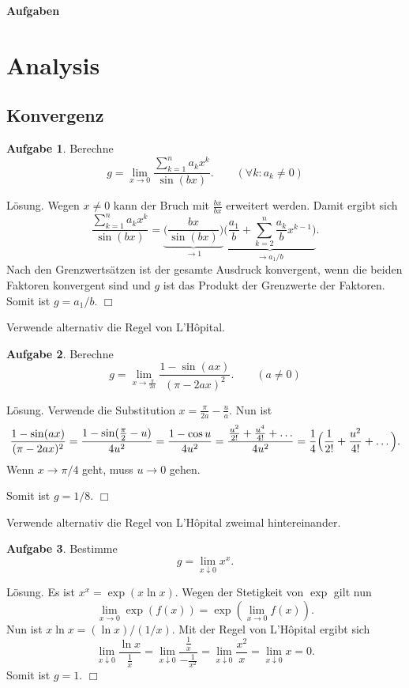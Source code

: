 \documentclass[a4paper,12pt,fleqn,twoside]{article}
\numberwithin{equation}{section}
\theoremstyle{definition}
\newtheorem{Aufgabe}{\sffamily Aufgabe}[section]
\begin{document}
\thispagestyle{empty}

\noindent
{\huge\sf\bfseries Aufgaben}

\tableofcontents

\section{Analysis}
\subsection{Konvergenz}
\begin{Aufgabe}
Berechne
\[g = \lim_{x\to 0}\frac{\sum_{k=1}^n a_k x^k}{\sin(bx)}.
\qquad(\forall k\colon a_k\ne 0)\]
\end{Aufgabe}
\noindent
Lösung.
Wegen $x\ne 0$ kann der Bruch mit $\frac{bx}{bx}$ erweitert
werden. Damit ergibt sich
\[\frac{\sum_{k=1}^n a_k x^k}{\sin(bx)}
= \underbrace{\bigg(\frac{bx}{\sin(bx)}\bigg)}_{\to 1}
\underbrace{\bigg(\frac{a_1}{b}+\sum_{k=2}^n\frac{a_k}{b}x^{k-1}\bigg)}_{\to a_1/b}.
\]
Nach den Grenzwertsätzen ist der gesamte Ausdruck konvergent, wenn
die beiden Faktoren konvergent sind und $g$ ist das Produkt
der Grenzwerte der Faktoren. Somit ist $g=a_1/b$. $\Box$

Verwende alternativ die Regel von L'Hôpital.

\begin{Aufgabe}
Berechne
\[g = \lim_{x\to\frac{\pi}{2a}} \frac{1-\sin(ax)}{(\pi-2ax)^2}.
\qquad(a\ne 0)\]
\end{Aufgabe}
\noindent
Lösung.
Verwende die Substitution $x=\frac{\pi}{2a}-\frac{u}{a}$.
Nun ist
\[
\frac{1-\sin(ax)}{(\pi-2ax)^2}
= \frac{1-\sin(\frac{\pi}{2}-u)}{4u^2}
= \frac{1-\cos u}{4u^2}\\
= \frac{\frac{u^2}{2!}+\frac{u^4}{4!}+\ldots}{4u^2}
= \frac{1}{4} \Big(\frac{1}{2!}+\frac{u^2}{4!}+\ldots\Big).
\]
Wenn $x\to\pi/4$ geht, muss $u\to 0$ gehen.

Somit ist $g=1/8$. $\Box$

Verwende alternativ die Regel von L'Hôpital zweimal hintereinander.

\begin{Aufgabe}
Bestimme
\[g=\lim_{x\downarrow 0} x^x.\]
\end{Aufgabe}
\noindent
Lösung. Es ist $x^x=\exp(x\ln x)$. Wegen der Stetigkeit von $\exp$
gilt nun
\[\lim_{x\to 0}\exp(f(x)) = \exp(\lim_{x\to 0} f(x)).\]
Nun ist $x\ln x = (\ln x)/(1/x).$
Mit der Regel von L'Hôpital ergibt sich
\[\lim_{x\downarrow 0} \frac{\ln x}{\frac{1}{x}}
= \lim_{x\downarrow 0} \frac{\frac{1}{x}}{-\frac{1}{x^2}}
= \lim_{x\downarrow 0}\frac{x^2}{x}
= \lim_{x\downarrow 0} x = 0.\]
Somit ist $g=1$. $\Box$
\end{document}
